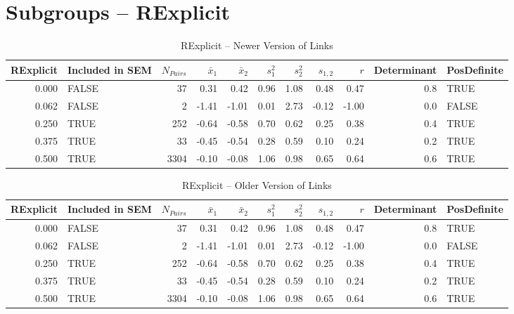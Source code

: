 \documentclass{article}\usepackage[]{graphicx}\usepackage[]{color}
\begin{document}
\section{Subgroups --  RExplicit }%
\begin{table}[ht]
\centering
\begin{tabular}{rlrrrrrrrrl}
  \hline
RExplicit & Included in SEM & $N_{Pairs}$ & $\bar{x}_1$ & $\bar{x}_2$ & $s_1^2$ & $s_2^2$ & $s_{1,2}$ & $r$ & Determinant & PosDefinite \\ 
  \hline
0.000 & FALSE & 37 & 0.31 & 0.42 & 0.96 & 1.08 & 0.48 & 0.47 & 0.8 & TRUE \\ 
  0.062 & FALSE & 2 & -1.41 & -1.01 & 0.01 & 2.73 & -0.12 & -1.00 & 0.0 & FALSE \\ 
  0.250 & TRUE & 252 & -0.64 & -0.58 & 0.70 & 0.62 & 0.25 & 0.38 & 0.4 & TRUE \\ 
  0.375 & TRUE & 33 & -0.45 & -0.54 & 0.28 & 0.59 & 0.10 & 0.24 & 0.2 & TRUE \\ 
  0.500 & TRUE & 3304 & -0.10 & -0.08 & 1.06 & 0.98 & 0.65 & 0.64 & 0.6 & TRUE \\ 
   \hline
\end{tabular}
\caption{RExplicit -- Newer Version of Links} 
\end{table}
\begin{table}[ht]
\centering
\begin{tabular}{rlrrrrrrrrl}
  \hline
RExplicit & Included in SEM & $N_{Pairs}$ & $\bar{x}_1$ & $\bar{x}_2$ & $s_1^2$ & $s_2^2$ & $s_{1,2}$ & $r$ & Determinant & PosDefinite \\ 
  \hline
0.000 & FALSE & 37 & 0.31 & 0.42 & 0.96 & 1.08 & 0.48 & 0.47 & 0.8 & TRUE \\ 
  0.062 & FALSE & 2 & -1.41 & -1.01 & 0.01 & 2.73 & -0.12 & -1.00 & 0.0 & FALSE \\ 
  0.250 & TRUE & 252 & -0.64 & -0.58 & 0.70 & 0.62 & 0.25 & 0.38 & 0.4 & TRUE \\ 
  0.375 & TRUE & 33 & -0.45 & -0.54 & 0.28 & 0.59 & 0.10 & 0.24 & 0.2 & TRUE \\ 
  0.500 & TRUE & 3304 & -0.10 & -0.08 & 1.06 & 0.98 & 0.65 & 0.64 & 0.6 & TRUE \\ 
   \hline
\end{tabular}
\caption{RExplicit -- Older Version of Links} 
\end{table}
\newpage 
\end{document}
